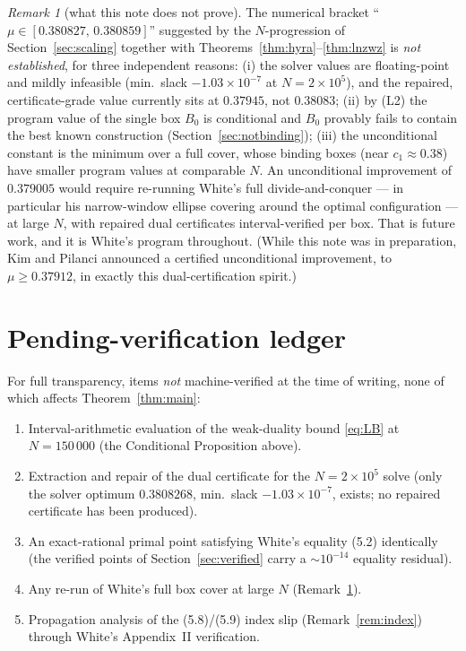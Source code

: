 \documentclass[11pt]{article}
\theoremstyle{remark}
\newtheorem{remark}[theorem]{Remark}
\begin{document}
\begin{remark}[what this note does not prove]\label{rem:notproved}
The numerical bracket ``$\mu \in [0.380827,\, 0.380859]$'' suggested by the
$N$-progression of Section~\ref{sec:scaling} together with
Theorems~\ref{thm:hyra}--\ref{thm:lnzwz} is \emph{not established}, for three
independent
reasons: (i) the solver values are floating-point and mildly infeasible
(min.\ slack $-1.03\times10^{-7}$ at $N = 2\times10^5$), and the repaired,
certificate-grade value currently sits at $0.37945$, not $0.38083$;
(ii) by (L2) the program value of the single box $B_0$ is conditional and
$B_0$ provably fails to contain the best known construction
(Section~\ref{sec:notbinding}); (iii) the unconditional constant is the
minimum over a full cover, whose binding boxes (near $c_1 \approx 0.38$)
have smaller program values at comparable $N$. An unconditional improvement
of $0.379005$ would require re-running White's full divide-and-conquer ---
in particular his narrow-window ellipse covering around the optimal
configuration --- at large $N$, with repaired dual certificates
interval-verified per box. That is future work, and it is White's program
throughout. (While this note was in preparation, Kim and Pilanci
\cite{KimPilanci26} announced a certified unconditional improvement, to
$\mu \ge 0.37912$, in exactly this dual-certification spirit.)
\end{remark}

\section{Pending-verification ledger}\label{sec:pending}

For full transparency, items \emph{not} machine-verified at the time of
writing, none of which affects Theorem~\ref{thm:main}:
\begin{enumerate}
\item Interval-arithmetic evaluation of the weak-duality bound
\eqref{eq:LB} at $N = 150\,000$ (the Conditional Proposition above).
\item Extraction and repair of the dual certificate for the
$N = 2\times10^5$ solve (only the solver optimum $0.3808268$, min.\ slack
$-1.03\times10^{-7}$, exists; no repaired certificate has been produced).
\item An exact-rational primal point satisfying White's equality (5.2)
identically (the verified points of Section~\ref{sec:verified} carry a
$\sim 10^{-14}$ equality residual).
\item Any re-run of White's full box cover at large $N$
(Remark~\ref{rem:notproved}).
\item Propagation analysis of the (5.8)/(5.9) index slip
(Remark~\ref{rem:index}) through White's Appendix~II verification.
\end{enumerate}
\end{document}
